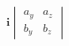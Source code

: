 \documentclass[preview]{standalone}
\begin{document}
\begin{align*}
\mathbf{i} \begin{vmatrix} a_y & a_z \\ b_y & b_z \end{vmatrix}
\end{align*}
\end{document}
